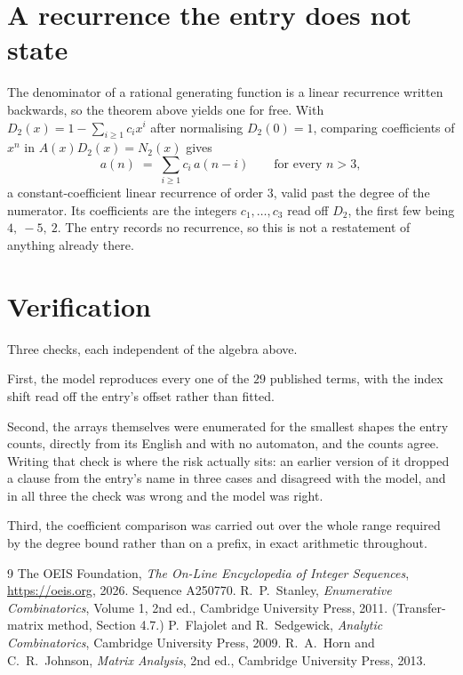 \documentclass[11pt,a4paper]{article}
\theoremstyle{plain}
\theoremstyle{definition}
\begin{document}
\section{A recurrence the entry does not state}

The denominator of a rational generating function is a linear recurrence written backwards, so
the theorem above yields one for free. With $D_2(x)=1-\sum_{i\ge1}c_ix^i$ after normalising
$D_2(0)=1$, comparing coefficients of $x^n$ in $A(x)D_2(x)=N_2(x)$ gives
\[
a(n)\;=\;\sum_{i\ge1}c_i\,a(n-i)\qquad\text{for every }n>3,
\]
a constant-coefficient linear recurrence of order $3$, valid past the degree of the
numerator. Its coefficients are the integers $c_1,\dots,c_{3}$ read off $D_2$, the first few being $4,\ -5,\ 2$. The entry records no recurrence, so this is not a restatement of anything
already there.

\section{Verification}

Three checks, each independent of the algebra above.

First, the model reproduces every one of the $29$ published terms, with the index shift
read off the entry's offset rather than fitted.

Second, the arrays themselves were enumerated for the smallest shapes the entry counts,
directly from its English and with no automaton, and the counts agree. Writing that check is
where the risk actually sits: an earlier version of it dropped a clause from the entry's name
in three cases and disagreed with the model, and in all three the check was wrong and the model
was right.

Third, the coefficient comparison was carried out over the whole range required by the degree
bound rather than on a prefix, in exact arithmetic throughout.

\begin{thebibliography}{9}
 The OEIS Foundation, \emph{The On-Line Encyclopedia of Integer
Sequences}, \url{https://oeis.org}, 2026. Sequence A250770.
 R.~P.~Stanley, \emph{Enumerative Combinatorics}, Volume 1, 2nd ed.,
Cambridge University Press, 2011. (Transfer-matrix method, Section 4.7.)
 P.~Flajolet and R.~Sedgewick, \emph{Analytic Combinatorics}, Cambridge
University Press, 2009.
 R.~A.~Horn and C.~R.~Johnson, \emph{Matrix Analysis}, 2nd ed., Cambridge
University Press, 2013.
\end{thebibliography}
\end{document}
